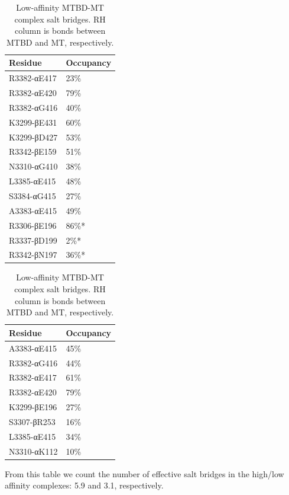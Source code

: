 \documentclass[10pt]{article} %
\begin{document}
\begin{table}
  \parbox{.45\linewidth}{
    \centering
    \begin{tabular}{| l | l |}
      \hline
      Residue & Occupancy \\\hline
      R3382-αE417 & 23\% \\\hline
      R3382-αE420 & 79\% \\\hline
      R3382-αG416 & 40\% \\\hline
      K3299-βE431 & 60\% \\\hline
      K3299-βD427 & 53\% \\\hline
      R3342-βE159 & 51\% \\\hline
      N3310-αG410 & 38\% \\\hline
      L3385-αE415 & 48\% \\\hline
      S3384-αG415 & 27\% \\\hline
      A3383-αE415 & 49\% \\\hline
      R3306-βE196 & 86\%*\\\hline
      R3337-βD199 & 2\%* \\\hline
      R3342-βN197 & 36\%*\\\hline
    \end{tabular}
    \caption{High-affinity MTBD-MT complex salt bridges. RH column is bonds between MTBD and MT, respectively.}
  }
  \hfill
  \parbox{.45\linewidth}{
    \centering
    \begin{tabular}{| l | l |}
      \hline
      Residue & Occupancy \\\hline
      A3383-αE415  & 45\% \\ \hline
      R3382-αG416  & 44\% \\ \hline
      R3382-αE417  & 61\% \\ \hline
      R3382-αE420  & 79\% \\ \hline
      K3299-βE196  & 27\% \\ \hline
      S3307-βR253  & 16\% \\ \hline
      L3385-αE415  & 34\% \\ \hline
      N3310-αK112  & 10\% \\ \hline
    \end{tabular}
    \caption{Low-affinity MTBD-MT complex salt bridges. RH column is bonds between MTBD and MT, respectively.}
  }
\end{table}

From this table we count the number of effective salt bridges in the high/low affinity complexes: 5.9 and 3.1, respectively.\\
\end{document}

